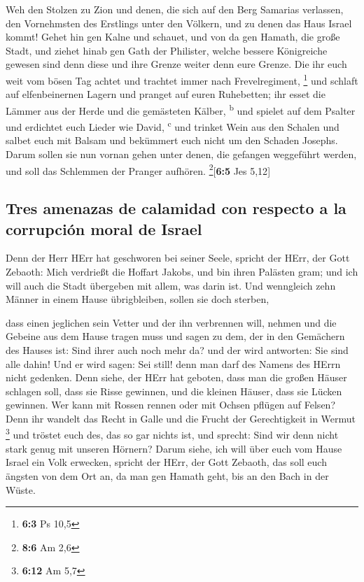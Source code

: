  Weh den Stolzen zu Zion und denen, die sich auf den Berg
Samarias verlassen, den Vornehmsten des Erstlings unter den Völkern, und
zu denen das Haus Israel kommt!  Gehet hin gen Kalne und
schauet, und von da gen Hamath, die große Stadt, und ziehet hinab gen
Gath der Philister, welche bessere Königreiche gewesen sind denn diese
und ihre Grenze weiter denn eure Grenze.  Die ihr euch
weit vom bösen Tag achtet und trachtet immer nach Frevelregiment,
\footnote{\textbf{6:3} Ps 10,5}  und schlaft auf
elfenbeinernen Lagern und pranget auf euren Ruhebetten; ihr esset die
Lämmer aus der Herde und die gemästeten Kälber, \textsuperscript{b}
 und spielet auf dem Psalter und erdichtet euch Lieder wie
David, \textsuperscript{c}  und trinket Wein aus den
Schalen und salbet euch mit Balsam und bekümmert euch nicht um den
Schaden Josephs.  Darum sollen sie nun vornan gehen unter
denen, die gefangen weggeführt werden, und soll das Schlemmen der
Pranger aufhören. \footnote{\textbf{8:6} Am 2,6}{[}\textbf{6:5} Jes
5,12{]}

\hypertarget{tres-amenazas-de-calamidad-con-respecto-a-la-corrupciuxf3n-moral-de-israel}{%
\subsection{Tres amenazas de calamidad con respecto a la corrupción
moral de
Israel}\label{tres-amenazas-de-calamidad-con-respecto-a-la-corrupciuxf3n-moral-de-israel}}

 Denn der Herr HErr hat geschworen bei seiner Seele,
spricht der HErr, der Gott Zebaoth: Mich verdrießt die Hoffart Jakobs,
und bin ihren Palästen gram; und ich will auch die Stadt übergeben mit
allem, was darin ist.  Und wenngleich zehn Männer in einem
Hause übrigbleiben, sollen sie doch sterben,

 dass einen jeglichen sein Vetter und der ihn verbrennen
will, nehmen und die Gebeine aus dem Hause tragen muss und sagen zu dem,
der in den Gemächern des Hauses ist: Sind ihrer auch noch mehr da? und
der wird antworten: Sie sind alle dahin! Und er wird sagen: Sei still!
denn man darf des Namens des HErrn nicht gedenken.  Denn
siehe, der HErr hat geboten, dass man die großen Häuser schlagen soll,
dass sie Risse gewinnen, und die kleinen Häuser, dass sie Lücken
gewinnen.  Wer kann mit Rossen rennen oder mit Ochsen
pflügen auf Felsen? Denn ihr wandelt das Recht in Galle und die Frucht
der Gerechtigkeit in Wermut \footnote{\textbf{6:12} Am 5,7}
 und tröstet euch des, das so gar nichts ist, und
sprecht: Sind wir denn nicht stark genug mit unseren Hörnern?
 Darum siehe, ich will über euch vom Hause Israel ein
Volk erwecken, spricht der HErr, der Gott Zebaoth, das soll euch ängsten
von dem Ort an, da man gen Hamath geht, bis an den Bach in der Wüste.

